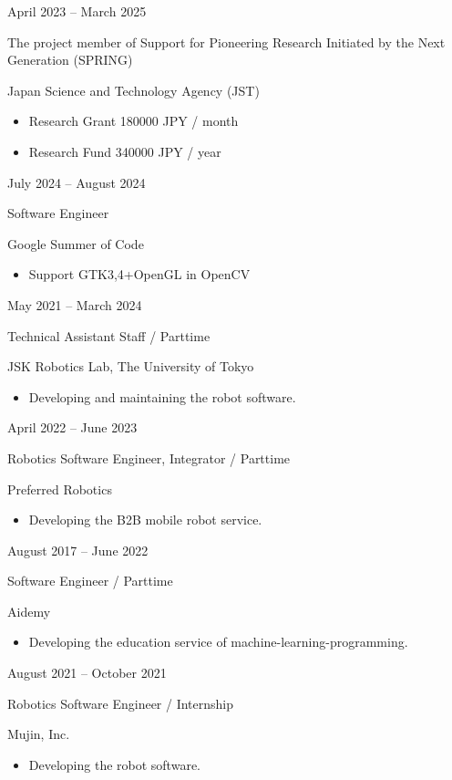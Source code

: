 \documentclass[a4paper,10pt]{article}
\newlength{\cvcolumngapwidth}
\newlength{\cvleftcolumnwidth}
\newlength{\cvrightcolumnwidth}
\newcommand{\cvtitlestyle}[1]{{\large\cvtitlefont\textcolor{cvtitlecolor}{#1}}}
\newcommand{\cvdurationstyle}[1]{{\small\cvdurationfont\textcolor{cvdurationcolor}{#1}}}
\newlength{\cvafteritemskipamount}
\newlength{\cvaftertitleskipamount}
\newlength{\cvparskip}
\newcommand{\cvitem}[2]{
    \begin{minipage}[t]{\cvleftcolumnwidth}
        \raggedleft #1
    \end{minipage}%
    \hspace{\cvcolumngapwidth}%
    \begin{minipage}[t]{\cvrightcolumnwidth}
        \setlength{\parskip}{\cvparskip} #2
    \end{minipage}

    \vspace{\cvafteritemskipamount}
}
\newcommand{\cvtitle}[1]{
    \cvtitlestyle{#1}

    \vspace{\cvaftertitleskipamount}
    \vspace{-\cvparskip}
}
\begin{document}
\cvitem{
  \cvdurationstyle{April 2023 -- March 2025}
}{
  \cvtitle{The project member of Support for Pioneering Research Initiated by the Next Generation (SPRING)}

  Japan Science and Technology Agency (JST)

  \begin{itemize}[leftmargin=*]
  \item Research Grant 180000 JPY / month
  \item Research Fund 340000 JPY / year
  \end{itemize}
}

\cvitem{
  \cvdurationstyle{July 2024 -- August 2024}
}{
  \cvtitle{Software Engineer}

  Google Summer of Code

  \begin{itemize}[leftmargin=*]
    \item Support GTK3,4+OpenGL in OpenCV
  \end{itemize}
}


\cvitem{
  \cvdurationstyle{May 2021 -- March 2024}
}{
  \cvtitle{Technical Assistant Staff / Parttime}

  JSK Robotics Lab, The University of Tokyo

  \begin{itemize}[leftmargin=*]
    \item Developing and maintaining the robot software.
  \end{itemize}
}

\cvitem{
  \cvdurationstyle{April 2022 -- June 2023}
}{
  \cvtitle{Robotics Software Engineer, Integrator / Parttime}

  Preferred Robotics

  \begin{itemize}[leftmargin=*]
    \item Developing the B2B mobile robot service.
  \end{itemize}
}

\cvitem{
  \cvdurationstyle{August 2017 -- June 2022}
}{
  \cvtitle{Software Engineer / Parttime}

  Aidemy

  \begin{itemize}[leftmargin=*]
    \item Developing the education service of machine-learning-programming.
  \end{itemize}
}

\cvitem{
  \cvdurationstyle{August 2021 -- October 2021}
}{
  \cvtitle{Robotics Software Engineer / Internship}

  Mujin, Inc.

  \begin{itemize}[leftmargin=*]
    \item Developing the robot software.
  \end{itemize}
}
\end{document}
